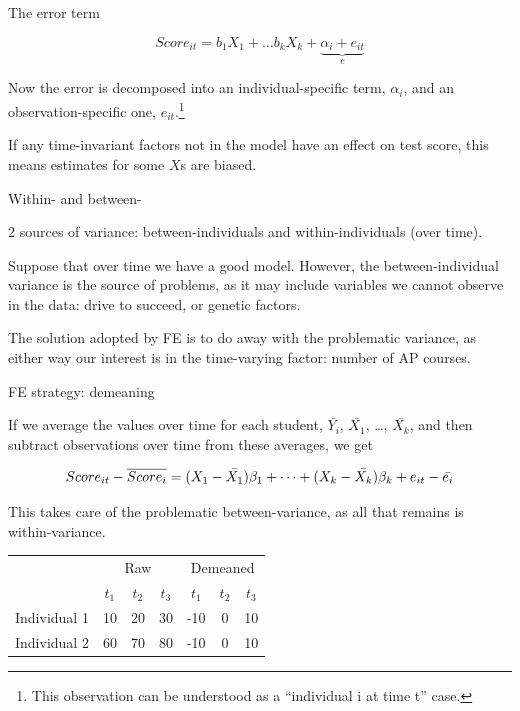 \documentclass[12pt,english,pdf,xcolor=dvipsnames,aspectratio=169,handout]{beamer}\usepackage[]{graphicx}\usepackage[]{xcolor}
\begin{document}
\begin{frame}{The error term}

\begin{equation}
Score_{it} = b_1X_1 + \dots b_kX_k + \underbrace{\alpha_i + e_{it}}_{e}
\end{equation}\bigskip

Now the error is decomposed into an individual-specific term, $\alpha_i$, and an observation-specific one, $e_{it}$.\footnote{This observation can be understood as a ``individual i at time t'' case.}\bigskip

If any time-invariant factors not in the model have an effect on test score, this means estimates for some $X$s are biased.

\end{frame}



\begin{frame}{Within- and between-}

2 sources of variance: between-individuals and within-individuals (over time).\bigskip

Suppose that over time we have a good model. However, the between-individual variance is the source of problems, as it may include variables we cannot observe in the data: drive to succeed, or genetic factors.\bigskip

The solution adopted by FE is to do away with the problematic variance, as either way our interest is in the time-varying factor: number of AP courses.

\end{frame}


\begin{frame}{FE strategy: demeaning}

If we average the values over time for each student, $\bar{Y_i}$, $\bar{X_1}$, \dots, $\bar{X_k}$, and then subtract observations over time from these averages, we get

\begin{equation}
\footnotesize
Score_{it} - \overline{Score_i} = (X_1 - \bar{X_1})\beta_1 + \dots + (X_k - \bar{X_k})\beta_k + e_{it} - \bar{e_i}
\end{equation}

This takes care of the problematic between-variance, as all that remains is within-variance.

\begin{table}
\footnotesize
\begin{tabular}{l c c c | c c c}
\toprule[0.2em]
             & \multicolumn{3}{c}{Raw} & \multicolumn{3}{c}{Demeaned} \\
             & $t_1$ & $t_2$ & $t_3$ & $t_1$ & $t_2$ & $t_3$ \\
\cmidrule{2-7}
Individual 1 & 10 & 20 & 30 & -10 & 0 & 10 \\
Individual 2 & 60 & 70 & 80 & -10 & 0 & 10 \\
\bottomrule[0.2em]
\end{tabular}
\end{table}

\end{frame}
\end{document}
